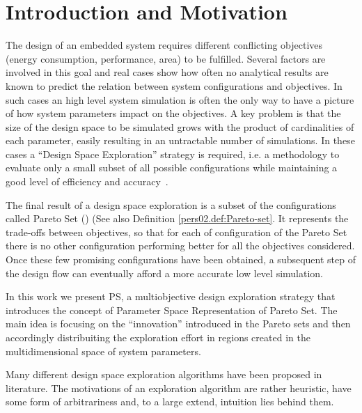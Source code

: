 
\section{Introduction and Motivation}

The design of an embedded system requires different conflicting
objectives (energy consumption, performance, area) to be fulfilled.
Several factors are involved in this goal and real cases show how
often no analytical results are known to predict the relation between
system configurations and objectives. In such cases an high level
system simulation is often the only way to have a picture of how system
parameters impact on the objectives.  A key problem is that the size
of the design space to be simulated grows with the product of
cardinalities of each parameter, easily resulting in an untractable number
of simulations. In these cases a ``Design Space
Exploration'' strategy is required, i.e. a methodology to evaluate
only a small subset of all possible configurations while maintaining a
good level of efficiency and accuracy~\cite{surviving_soc}.

The final result of a design space exploration is a subset of the
configurations called Pareto Set (\cite{pareto}) (See also Definition
\ref{pers02.def:Pareto-set}. It represents the trade-offs between
objectives, so that for each of configuration of the Pareto Set there is no
other configuration performing better for all the objectives
considered. Once these few promising configurations have been obtained, a
subsequent step of the design flow can eventually afford a more
accurate low level simulation.

In this work we present PS, a multiobjective design exploration
strategy that introduces the concept of Parameter Space Representation
of Pareto Set. The main idea is focusing on the ``innovation''
introduced in the Pareto sets and then accordingly distribuiting the
exploration effort in regions created in the multidimensional space of
system parameters.

Many different design space exploration algorithms have been proposed
in literature.  The motivations of an exploration
algorithm are rather heuristic, have some form of arbitrariness and,
to a large extend, intuition lies behind them.

